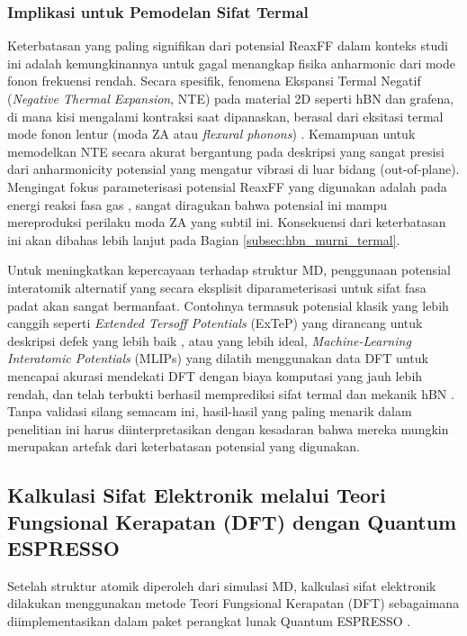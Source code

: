 \subsubsection{Implikasi untuk Pemodelan Sifat Termal}
Keterbatasan yang paling signifikan dari potensial ReaxFF dalam konteks studi ini adalah kemungkinannya untuk gagal menangkap fisika anharmonic dari mode fonon frekuensi rendah. Secara spesifik, fenomena Ekspansi Termal Negatif (\textit{Negative Thermal Expansion}, NTE) pada material 2D seperti hBN dan grafena, di mana kisi mengalami kontraksi saat dipanaskan, berasal dari eksitasi termal mode fonon lentur (moda ZA atau \textit{flexural phonons}) \citep{Sarikurt2022}. Kemampuan untuk memodelkan NTE secara akurat bergantung pada deskripsi yang sangat presisi dari anharmonicity potensial yang mengatur vibrasi di luar bidang (out-of-plane). Mengingat fokus parameterisasi potensial ReaxFF yang digunakan adalah pada energi reaksi fasa gas \citep{Lele2022}, sangat diragukan bahwa potensial ini mampu mereproduksi perilaku moda ZA yang subtil ini. Konsekuensi dari keterbatasan ini akan dibahas lebih lanjut pada Bagian \ref{subsec:hbn_murni_termal}.

Untuk meningkatkan kepercayaan terhadap struktur MD, penggunaan potensial interatomik alternatif yang secara eksplisit diparameterisasi untuk sifat fasa padat akan sangat bermanfaat. Contohnya termasuk potensial klasik yang lebih canggih seperti \textit{Extended Tersoff Potentials} (ExTeP) yang dirancang untuk deskripsi defek yang lebih baik \citep{Los2017}, atau yang lebih ideal, \textit{Machine-Learning Interatomic Potentials} (MLIPs) yang dilatih menggunakan data DFT untuk mencapai akurasi mendekati DFT dengan biaya komputasi yang jauh lebih rendah, dan telah terbukti berhasil memprediksi sifat termal dan mekanik hBN \citep{NietoLuna2025, Choyal2024}. Tanpa validasi silang semacam ini, hasil-hasil yang paling menarik dalam penelitian ini harus diinterpretasikan dengan kesadaran bahwa mereka mungkin merupakan artefak dari keterbatasan potensial yang digunakan.

\subsection{Kalkulasi Sifat Elektronik melalui Teori Fungsional Kerapatan (DFT) dengan Quantum ESPRESSO}
\label{subsec:dft_qe}
Setelah struktur atomik diperoleh dari simulasi MD, kalkulasi sifat elektronik dilakukan menggunakan metode Teori Fungsional Kerapatan (DFT) \citep{Hohenberg1964, Kohn1965} sebagaimana diimplementasikan dalam paket perangkat lunak Quantum ESPRESSO \citep{Giannozzi2009, Giannozzi2017}.

